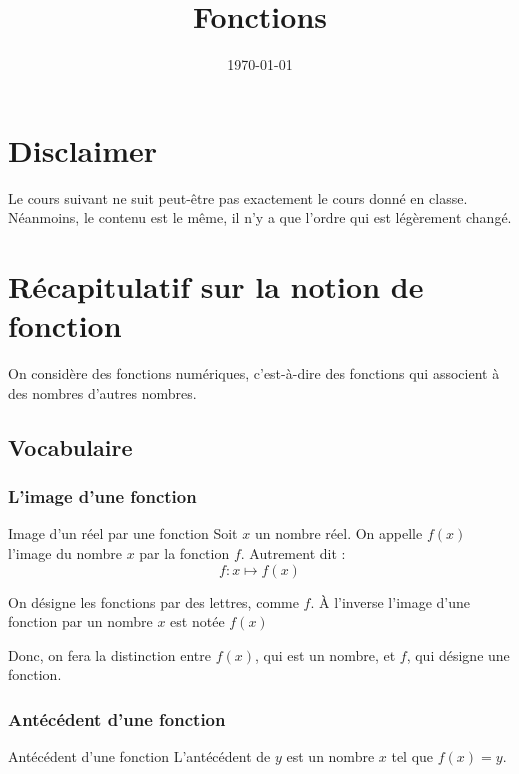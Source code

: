 \documentclass[11pt]{article}
\date{\today}
\title{Fonctions}
\begin{document}
\maketitle

\section{Disclaimer}
\label{sec:org8cd7bbe}
Le cours suivant ne suit peut-être pas exactement le cours donné en classe.
Néanmoins, le contenu est le même, il n'y a que l'ordre qui est légèrement
changé.

\section{Récapitulatif sur la notion de fonction}
\label{sec:org3e819dc}

On considère des fonctions numériques, c'est-à-dire des fonctions qui associent
à des nombres d'autres nombres.

\subsection{Vocabulaire}
\label{sec:org2332792}

\subsubsection{L'image d'une fonction}
\label{sec:orgabde0e1}

\begin{defi}{Image d'un réel par une fonction}
Soit $x$ un nombre réel. On appelle $f(x)$ l'image du nombre $x$ par la fonction $f$. Autrement dit :
$$f : x \longmapsto f(x)$$
\end{defi}

\begin{rem}
   On désigne les fonctions par des lettres, comme $f$. À l'inverse l'image d'une fonction par un nombre $x$ est notée $f(x)$

   Donc, on fera la distinction entre $f(x)$, qui est un nombre, et $f$, qui désigne une fonction.
\end{rem}


\subsubsection{Antécédent d'une fonction}
\label{sec:org45f8d3d}

\begin{defi}{Antécédent d'une fonction}
L'antécédent de $y$ est un nombre $x$ tel que $f(x) = y$.
\end{defi}
\end{document}
